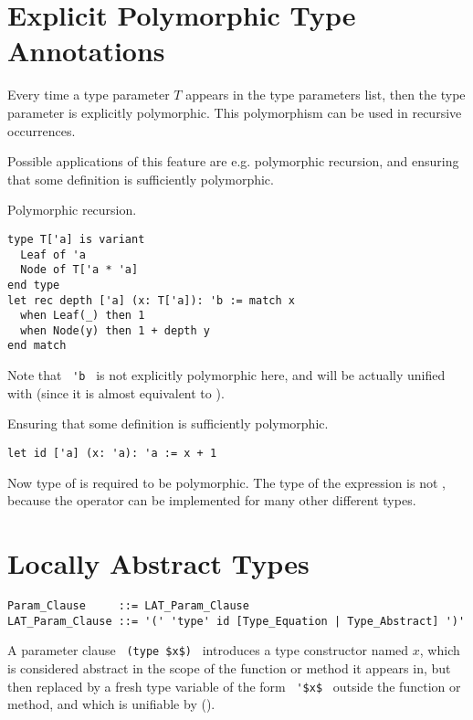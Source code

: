 \section{Explicit Polymorphic Type Annotations}
\label{sec:explicit-polymorphic-type-annotations}

Every time a type parameter $T$ appears in the type parameters list, then the type parameter is explicitly polymorphic. This polymorphism can be used in recursive occurrences. 

Possible applications of this feature are e.g. polymorphic recursion, and ensuring that some definition is sufficiently polymorphic.

\example Polymorphic recursion.
\begin{lstlisting}
type T['a] is variant
  Leaf of 'a
  Node of T['a * 'a]
end type
let rec depth ['a] (x: T['a]): 'b := match x
  when Leaf(_) then 1
  when Node(y) then 1 + depth y
end match
\end{lstlisting}
Note that ~\lstinline!'b!~ is not explicitly polymorphic here, and will be actually unified with  (since it is almost equivalent to ). 

\example Ensuring that some definition is sufficiently polymorphic.
\begin{lstlisting}
let id ['a] (x: 'a): 'a := x + 1 
\end{lstlisting}
Now type of  is required to be polymorphic. The type of the expression  is not , because the operator \code{+} can be implemented for many other different types.





\section{Locally Abstract Types}
\label{sec:locally-abstract-types}

\grammar\begin{lstlisting}
Param_Clause     ::= LAT_Param_Clause
LAT_Param_Clause ::= '(' 'type' id [Type_Equation | Type_Abstract] ')'
\end{lstlisting}

A parameter clause ~\lstinline!(type $x$)!~ introduces a type constructor named $x$, which is considered abstract in the scope of the function or method it appears in, but then replaced by a fresh type variable of the form ~\lstinline!'$x$!~ outside the function or method, and which is unifiable by ().





